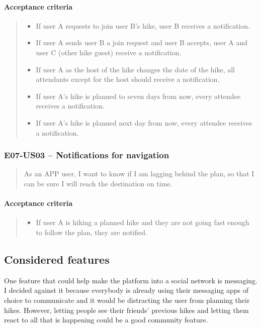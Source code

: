 \paragraph*{Acceptance criteria}
\begin{quote}
\begin{itemize}
    \item If user A requests to join user B's hike, user B receives a notification.
    \item If user A sends user B a join request and user B accepts, user A and user C (other hike guest) receive a notification.
    \item If user A as the host of the hike changes the date of the hike, all attendants except for the host should receive a notification.
    \item If user A's hike is planned to seven days from now, every attendee receives a notification.
    \item If user A's hike is planned next day from now, every attendee receives a notification.
\end{itemize}
\end{quote}

\subsubsection*{E07-US03 -- Notifications for navigation}
\begin{quote}
As an APP user, I want to know if I am lagging behind the plan, so that I can be sure I will reach the destination on time.
\end{quote}

\paragraph*{Acceptance criteria}
\begin{quote}
\begin{itemize}
    \item If user A is hiking a planned hike and they are not going fast enough to follow the plan, they are notified.
\end{itemize}
\end{quote}


\subsection*{Considered features}
One feature that could help make the platform into a social network is messaging.
I decided against it because everybody is already using their messaging apps of choice to communicate and it would be distracting the user from planning their hikes.
However, letting people see their friends' previous hikes and letting them react to all that is happening could be a good community feature.

